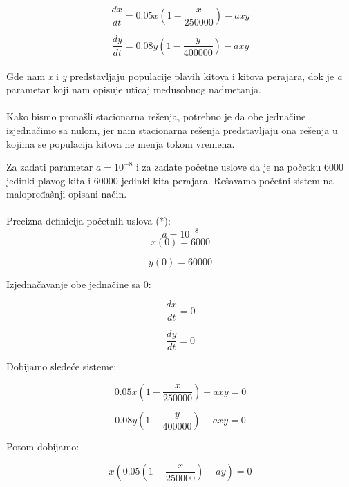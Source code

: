 \documentclass[a4paper]{article}
\begin{document}
{	\begin{equation}
		\frac{dx}{dt} = 0.05x(1 - \frac{x}{250000}) - axy
	\end{equation}
	
	\begin{equation}
		\frac{dy}{dt} = 0.08y(1 - \frac{y}{400000}) - axy
	\end{equation}
	\\
	Gde nam \textit{x} i \textit{y} predstavljaju populacije plavih kitova i kitova perajara, dok je \textit{a} parametar koji nam opisuje uticaj međusobnog nadmetanja.\\
	\\
	Kako bismo pronašli stacionarna rešenja, potrebno je da obe jednačine izjednačimo sa nulom, jer nam stacionarna rešenja predstavljaju ona rešenja u kojima se populacija kitova ne menja tokom vremena.\\
	
	\newpage
	
	Za zadati parametar $a = 10^{-8} $ i za zadate početne uslove da je na početku 6000 jedinki plavog kita i 60000 jedinki kita perajara. Rešavamo početni sistem na malopređašnji opisani način. \\ 
	\\

	Precizna definicija početnih uslova (*): \\
	\[
		a = 10^{-8}
	\]
	\[
		x(0) = 6000
	\]

	\[
		y(0) = 60 000
	\]
	
	Izjednačavanje obe jednačine sa 0:
	
	\begin{equation}
		\frac{dx}{dt} = 0 
	\end{equation}

	\begin{equation}
		\frac{dy}{dt} = 0
	\end{equation}
	
	Dobijamo sledeće sisteme:
	
	\begin{equation}
		0.05x(1 - \frac{x}{250000}) - axy = 0
	\end{equation}
	
	\begin{equation}
		0.08y(1 - \frac{y}{400000}) - axy = 0
	\end{equation}
		
	Potom dobijamo:
	
	\[
		x(0.05(1 - \frac{x}{250000}) - ay) = 0
	\]
	
}
\end{document}

